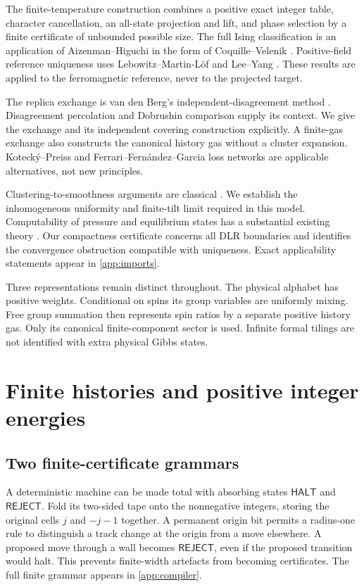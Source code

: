 \documentclass[11pt,reqno]{amsart}
\numberwithin{equation}{section}
\theoremstyle{definition}
\theoremstyle{remark}
\newcommand{\HALT}{\mathsf{HALT}}
\newcommand{\REJECT}{\mathsf{REJECT}}
\begin{document}
The finite-temperature construction combines a positive exact integer table, character cancellation, an all-state projection and lift, and phase selection by a finite certificate of unbounded possible size. The full Ising classification is an application of Aizenman--Higuchi in the form of Coquille--Velenik \cite[Corollary~1.1]{CoquilleVelenik2012}. Positive-field reference uniqueness uses Lebowitz--Martin-L\"of \cite[Theorem~1 and p.~278]{LebowitzMartinLof1972} and Lee--Yang \cite{LeeYang1952}. These results are applied to the ferromagnetic reference, never to the projected target.

The replica exchange is van den Berg's independent-disagreement method \cite[Theorem~1]{VanDenBerg1993}. Disagreement percolation \cite{VanDenBergMaes1994} and Dobrushin comparison \cite{Dobrushin1968,RebeschiniVanHandel2014} supply its context. We give the exchange and its independent covering construction explicitly. A finite-gas exchange also constructs the canonical history gas without a cluster expansion. Koteck\'y--Preiss \cite{KoteckyPreiss1986} and Ferrari--Fern\'andez--Garcia loss networks \cite{FerrariFernandezGarcia2002} are applicable alternatives, not new principles.

Clustering-to-smoothness arguments are classical \cite{Lebowitz1972Correlations,LebowitzPenrose1968}. We establish the inhomogeneous uniformity and finite-tilt limit required in this model. Computability of pressure and equilibrium states has a substantial existing theory \cite{GayralSablikTaati2025,BinderHeLiZhang2025,FawziFawziScalet2024}. Our compactness certificate concerns all DLR boundaries and identifies the convergence obstruction compatible with uniqueness. Exact applicability statements appear in \cref{app:imports}.

Three representations remain distinct throughout. The physical alphabet has positive weights. Conditional on spins its group variables are uniformly mixing. Free group summation then represents spin ratios by a separate positive history gas. Only its canonical finite-component sector is used. Infinite formal tilings are not identified with extra physical Gibbs states.


\section{Finite histories and positive integer energies}\label{sec:construction}

\subsection{Two finite-certificate grammars}
A deterministic machine can be made total with absorbing states $\HALT$ and $\REJECT$. Fold its two-sided tape onto the nonnegative integers, storing the original cells $j$ and $-j-1$ together. A permanent origin bit permits a radius-one rule to distinguish a track change at the origin from a move elsewhere. A proposed move through a wall becomes $\REJECT$, even if the proposed transition would halt. This prevents finite-width artefacts from becoming certificates. The full finite grammar appears in \cref{app:compiler}.
\end{document}
